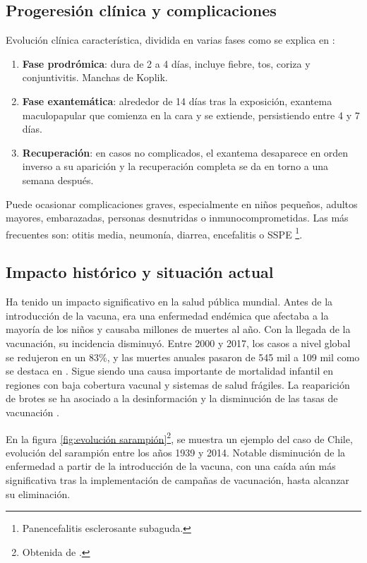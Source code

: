 \subsection{Progeresión clínica y complicaciones}
Evolución clínica característica, dividida en varias fases como se explica en \cite{cdc_measles}:
\begin{enumerate}
    \item \textbf{Fase prodrómica}: dura de 2 a 4 días, incluye fiebre, tos, coriza y conjuntivitis. Manchas de Koplik.
    \item \textbf{Fase exantemática}: alrededor de 14 días tras la exposición, exantema maculopapular que comienza en la cara y se extiende, persistiendo entre 4 y 7 días.
    \item \textbf{Recuperación}: en casos no complicados, el exantema desaparece en orden inverso a su aparición y la recuperación completa se da en torno a una semana después.
\end{enumerate}

Puede ocasionar complicaciones graves, especialmente en niños pequeños, adultos mayores, embarazadas, personas desnutridas o inmunocomprometidas. Las más frecuentes son: otitis media, neumonía, diarrea, encefalitis o SSPE \footnote{Panencefalitis esclerosante subaguda.}.

\subsection{Impacto histórico y situación actual}
Ha tenido un impacto significativo en la salud pública mundial. Antes de la introducción de la vacuna, era una enfermedad endémica que afectaba a la mayoría de los niños y causaba millones de muertes al año. Con la llegada de la vacunación, su incidencia disminuyó. Entre 2000 y 2017, los casos a nivel global se redujeron en un 83\%, y las muertes anuales pasaron de 545 mil a 109 mil como se destaca en \cite{shanks2014measles}. 
Sigue siendo una causa importante de mortalidad infantil en regiones con baja cobertura vacunal y sistemas de salud frágiles. La reaparición de brotes se ha asociado a la desinformación y la disminución de las tasas de vacunación \cite{fischer2016zinc}.

En la figura \ref{fig:evolución sarampión}\footnote{Obtenida de \cite{ahumada2015modelos}.}, se muestra un ejemplo del caso de Chile, evolución del sarampión entre los años 1939 y 2014. Notable disminución de la enfermedad a partir de la introducción de la vacuna, con una caída aún más significativa tras la implementación de campañas de vacunación, hasta alcanzar su eliminación.

